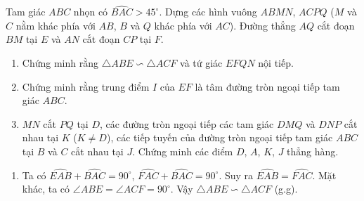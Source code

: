 \begin{ex}%
    Tam giác $ABC$ nhọn có $\widehat{BAC}>45^\circ$. Dựng các hình vuông $ABMN$, $ACPQ$ ($M$ và $C$ nằm khác phía với $AB$, $B$ và $Q$ khác phía với $AC$). Đường thẳng $AQ$ cắt đoạn $BM$ tại $E$ và $AN$ cắt đoạn $CP$ tại $F$.
    \begin{enumerate}
        \item Chứng minh rằng $\triangle ABE\backsim \triangle ACF$ và tứ giác $EFQN$ nội tiếp.
        \item Chứng minh rằng trung điểm $I$ của $EF$ là tâm đường tròn ngoại tiếp tam giác $ABC$.
        \item $MN$ cắt $PQ$ tại $D$, các đường tròn ngoại tiếp các tam giác $DMQ$ và $DNP$ cắt nhau tại $K$ ($K \neq D$), các tiếp tuyến của đường tròn ngoại tiếp tam giác $ABC$ tại $B$ và $C$ cắt nhau tại $J$. Chứng minh các điểm $D$, $A$, $K$, $J$ thẳng hàng.
        \end{enumerate}
\loigiai
    {
    \begin{center}
    \end{center}
    \begin{enumerate}
        \item Ta có $\widehat{EAB} + \widehat{BAC} = 90^\circ$, $\widehat{FAC} + \widehat{BAC} = 90^\circ$. Suy ra $\widehat{EAB}=\widehat{FAC}$. Mặt khác, ta có $\angle ABE = \angle ACF = 90^\circ$. Vậy $\triangle ABE \backsim \triangle ACF$ (g.g).
        

\end{enumerate}}
\end{ex}
